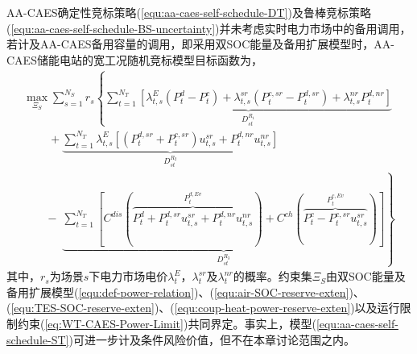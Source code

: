 AA-CAES确定性竞标策略(\ref{equ:aa-caes-self-schedule-DT})及鲁棒竞标策略(\ref{equ:aa-caes-self-schedule-BS-uncertainty})并未考虑实时电力市场中的备用调用，若计及AA-CAES备用容量的调用，即采用双SOC能量及备用扩展模型时，AA-CAES储能电站的宽工况随机竞标模型目标函数为，
\begin{equation}
\label{equ:aa-caes-self-schedule-ST}
\begin{array}{l}
\mathop {\max }\limits_{\Xi_{S}} \sum\limits_{s = 1}^{{N_S}} {{r_s}} \left\{ {\underbrace {\sum\limits_{t = 1}^{N_T} {[ {\lambda _{t,s}^E({P_t^d - P_t^c}) + \lambda _{t,s}^{sr}({P_t^{c,sr} - P_t^{d,sr}}) + \lambda _{t,s}^{nr}P_t^{d,nr}}]} }_{D_{st}^{{R_1}}}} \right.\;\\
\;\;\;\;\;\;\;\; + \underbrace {\sum\limits_{t = 1}^{N_T} {\lambda _{t,s}^E[{({P_t^{d,sr} + P_t^{c,sr}})u_{t,s}^{sr} + P_t^{d,nr}u_{t,s}^{nr}}]} }_{D_{st}^{{R_2}}}\\
\;\;\;\;\;\;\; - \left. {\;\underbrace {\sum\limits_{t = 1}^{N_T} {[{C^{dis}({\overbrace {P_t^d + P_t^{d,sr}u_{t,s}^{sr} + P_t^{d,nr}u_{t,s}^{nr}}^{P_t^{d,Ev}}}) + C^{ch}({\overbrace {P_t^c - P_t^{c,sr}u_{t,s}^{sr}}^{P_t^{c,Ev}}})}]} }_{D_{st}^{{R_3}}}} \right\}
\end{array}
\end{equation}
其中，$r_s$为场景$s$下电力市场电价$\lambda_t^E$，$\lambda_t^{sr}$及$\lambda_t^{nr}$的概率。约束集$\Xi_{S}$由双SOC能量及备用扩展模型(\ref{equ:def-power-relation})、(\ref{equ:air-SOC-reserve-exten})、(\ref{equ:TES-SOC-reserve-exten})、(\ref{equ:coup-heat-power-reserve-exten})以及运行限制约束(\ref{eq:WT-CAES-Power-Limit})共同界定。事实上，模型(\ref{equ:aa-caes-self-schedule-ST})可进一步计及条件风险价值，但不在本章讨论范围之内。



